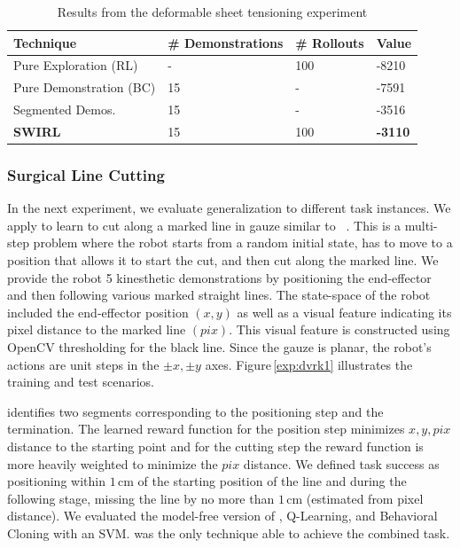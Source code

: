 \begin{table}[ht!]
\centering
\scriptsize
\caption{Results from the deformable sheet tensioning experiment}
\label{my-label}
\begin{tabular}{l|l|l|l}
{Technique} & { \# Demonstrations} & { \# Rollouts} & {Value} \\
\hline
Pure Exploration (RL)                   & -                                        & 100                                & -8210                        \\
Pure Demonstration  (BC)                            & 15                                       & -                                  & -7591                        \\
Segmented Demos.                  & 15                                       & -                                  & -3516                        \\
\textbf{SWIRL}                  & 15                                       & 100                                & \textbf{-3110}                    
\end{tabular}
\end{table}


\subsubsection{Surgical Line Cutting}
In the next experiment, we evaluate generalization to different task instances.
We apply \hirl to learn to cut along a marked line in gauze similar to ~\cite{murali2015learning}.
This is a multi-step problem where the robot starts from a random initial state, has to move to a position that allows it to start the cut, and then cut along the marked line.
We provide the robot 5 kinesthetic demonstrations by positioning the end-effector and then following various marked straight lines.
The state-space of the robot included the end-effector position $(x,y)$ as well as a visual feature indicating its pixel distance to the marked line $(pix)$.
This visual feature is constructed using OpenCV thresholding for the black line.
Since the gauze is planar, the robot's actions are unit steps in the $\pm x, \pm y$ axes.
Figure\,\ref{exp:dvrk1} illustrates the training and test scenarios.

\hirl identifies two segments corresponding to the positioning step and the termination.
The learned reward function for the position step minimizes $x,y,pix$ distance to the starting point and for the cutting step the reward function is more heavily weighted to minimize the $pix$ distance.
We defined task success as positioning within $1$\,cm of the starting position of the line and during the following stage, missing the line by no more than $1$\,cm (estimated from pixel distance).
We evaluated the model-free version of \hirl, Q-Learning, and Behavioral Cloning with an SVM.
\hirl was the only technique able to achieve the combined task.


